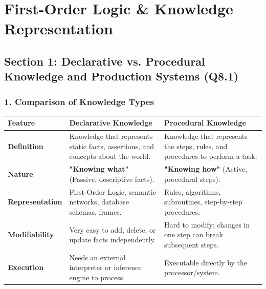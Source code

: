 \chapter{First-Order Logic \& Knowledge Representation}



\section{Section 1: Declarative vs. Procedural Knowledge and Production Systems (Q8.1)}

\subsection{1. Comparison of Knowledge Types}

\begin{table}[H]
\centering
\begin{tabular}{|p{}|p{}|p{}|}
\hline
Feature & Declarative Knowledge & Procedural Knowledge \\
\hline
\textbf{Definition} & Knowledge that represents static facts, assertions, and concepts about the world. & Knowledge that represents the steps, rules, and procedures to perform a task. \\
\hline
\textbf{Nature} & \textbf{"Knowing what"} (Passive, descriptive facts). & \textbf{"Knowing how"} (Active, procedural steps). \\
\hline
\textbf{Representation} & First-Order Logic, semantic networks, database schemas, frames. & Rules, algorithms, subroutines, step-by-step procedures. \\
\hline
\textbf{Modifiability} & Very easy to add, delete, or update facts independently. & Hard to modify; changes in one step can break subsequent steps. \\
\hline
\textbf{Execution} & Needs an external interpreter or inference engine to process. & Executable directly by the processor/system. \\
\hline
\end{tabular}
\end{table}

